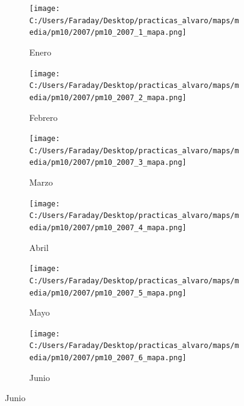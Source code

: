 \documentclass[12pt]{article}
\begin{document}
\begin{figure}[H]
\centering
\begin{subfigure}[H]{0.15\textwidth}
\texttt{[image: C:/Users/Faraday/Desktop/practicas\_alvaro/maps/media/pm10/2007/pm10\_2007\_1\_mapa.png]}
\captionsetup{labelformat=empty}
\caption{Enero}
\label{fig:map-pm10-2007-1}
\end{subfigure}
%
\begin{subfigure}[H]{0.15\textwidth}
\texttt{[image: C:/Users/Faraday/Desktop/practicas\_alvaro/maps/media/pm10/2007/pm10\_2007\_2\_mapa.png]}
\captionsetup{labelformat=empty}
\caption{Febrero}
\label{fig:map-pm10-2007-2}
\end{subfigure}
%
\begin{subfigure}[H]{0.15\textwidth}
\texttt{[image: C:/Users/Faraday/Desktop/practicas\_alvaro/maps/media/pm10/2007/pm10\_2007\_3\_mapa.png]}
\captionsetup{labelformat=empty}
\caption{Marzo}
\label{fig:map-pm10-2007-3}
\end{subfigure}
%
\begin{subfigure}[H]{0.15\textwidth}
\texttt{[image: C:/Users/Faraday/Desktop/practicas\_alvaro/maps/media/pm10/2007/pm10\_2007\_4\_mapa.png]}
\captionsetup{labelformat=empty}
\caption{Abril}
\label{fig:map-pm10-2007-4}
\end{subfigure}
%
\begin{subfigure}[H]{0.15\textwidth}
\texttt{[image: C:/Users/Faraday/Desktop/practicas\_alvaro/maps/media/pm10/2007/pm10\_2007\_5\_mapa.png]}
\captionsetup{labelformat=empty}
\caption{Mayo}
\label{fig:map-pm10-2007-5}
\end{subfigure}
%
\begin{subfigure}[H]{0.15\textwidth}
\texttt{[image: C:/Users/Faraday/Desktop/practicas\_alvaro/maps/media/pm10/2007/pm10\_2007\_6\_mapa.png]}
\captionsetup{labelformat=empty}
\caption{Junio}
\label{fig:map-pm10-2007-6}
\end{subfigure}


\end{figure}
\end{document}
